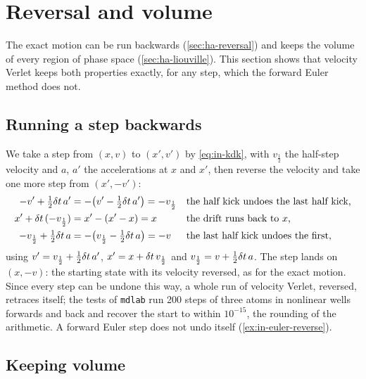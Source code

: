 \section{Reversal and volume}
\label{sec:in-reversal}

The exact motion can be run backwards (\cref{sec:ha-reversal}) and keeps
the volume of every region of phase space (\cref{sec:ha-liouville}). This
section shows that velocity Verlet keeps both properties exactly, for any
step, which the forward Euler method does not.

\subsection*{Running a step backwards}

We take a step from $(x, v)$ to $(x', v')$ by \cref{eq:in-kdk}, with
$v_{\frac12}$ the half-step velocity and $a$, $a'$ the accelerations at
$x$ and $x'$, then reverse the velocity and take one more step from $(x',
-v')$:
\begin{align*}
   -v' + \tfrac12\delta t\,a' &= -\bigl(v' - \tfrac12\delta t\,a'\bigr) = -v_{\frac12}
   && \text{the half kick undoes the last half kick,}\\
   x' + \delta t\,(-v_{\frac12}) &= x' - (x' - x) = x
   && \text{the drift runs back to $x$,}\\
   -v_{\frac12} + \tfrac12\delta t\,a &= -\bigl(v_{\frac12} - \tfrac12\delta t\,a\bigr)
   = -v
   && \text{the last half kick undoes the first,}
\end{align*}
using $v' = v_{\frac12} + \frac12\delta t\,a'$, $x' = x + \delta t\,v_{\frac12}$ and
$v_{\frac12} = v + \frac12\delta t\,a$. The step lands on $(x, -v)$: the
starting state with its velocity reversed, as for the exact motion. Since
every step can be undone this way, a whole run of velocity Verlet,
reversed, retraces itself; the tests of \texttt{mdlab} run 200 steps of
three atoms in nonlinear wells forwards and back and recover the start to
within $10^{-15}$, the rounding of the arithmetic. A forward Euler step does not
undo itself (\cref{ex:in-euler-reverse}).

\subsection*{Keeping volume}


